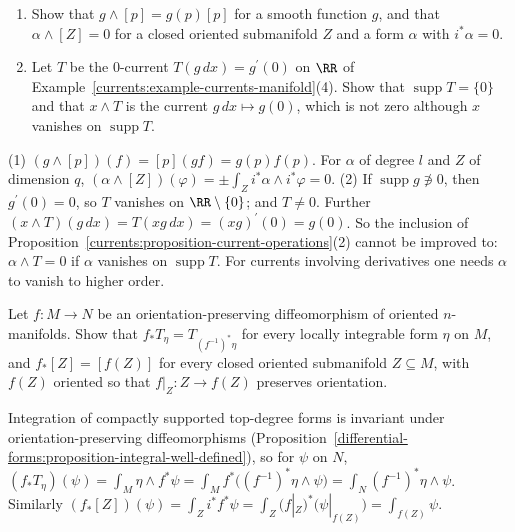 \begin{exercise}\label{currents:exercise-current-products-functions}
\begin{enumerate}
\item Show that $g \wedge [p] = g(p)[p]$ for a smooth function $g$, and that $\alpha \wedge [Z] = 0$ for a closed oriented submanifold $Z$ and a form $\alpha$ with $i^*\alpha = 0$.
\item Let $T$ be the $0$-current $T(g\,dx) = g^{\prime}(0)$ on $\RR$ of Example~\ref{currents:example-currents-manifold}(4). Show that $\operatorname{supp}T = \{0\}$ and that $x \wedge T$ is the current
$g\,dx \mapsto g(0)$, which is not zero although $x$ vanishes on $\operatorname{supp}T$.
\end{enumerate}
\end{exercise}

\begin{solution}
(1) $(g \wedge [p])(f) = [p](gf) = g(p)f(p)$. For $\alpha$ of degree $l$ and $Z$ of dimension $q$, $(\alpha \wedge [Z])(\varphi) = \pm\int_Zi^*\alpha \wedge i^*\varphi = 0$.
(2) If $\operatorname{supp}g \not\ni 0$, then $g^{\prime}(0) = 0$, so $T$ vanishes on $\RR \setminus \{0\}$; and $T \neq 0$. Further $(x \wedge T)(g\,dx) = T(xg\,dx) = (xg)^{\prime}(0) = g(0)$. So the inclusion
of Proposition~\ref{currents:proposition-current-operations}(2) cannot be improved to: $\alpha \wedge T = 0$ if $\alpha$ vanishes on $\operatorname{supp}T$. For currents involving derivatives one needs
$\alpha$ to vanish to higher order.
\end{solution}

\begin{exercise}\label{currents:exercise-pushforward-diffeomorphism}
Let $f \colon M \to N$ be an orientation-preserving diffeomorphism of oriented $n$-manifolds. Show that $f_*T_\eta = T_{(f^{-1})^*\eta}$ for every locally integrable form $\eta$ on $M$, and
$f_*[Z] = [f(Z)]$ for every closed oriented submanifold $Z \subseteq M$, with $f(Z)$ oriented so that $f|_Z \colon Z \to f(Z)$ preserves orientation.
\end{exercise}

\begin{solution}
Integration of compactly supported top-degree forms is invariant under orientation-preserving diffeomorphisms (Proposition~\ref{differential-forms:proposition-integral-well-defined}), so for $\psi$ on $N$,
$(f_*T_\eta)(\psi) = \int_M\eta \wedge f^*\psi = \int_Mf^*\bigl((f^{-1})^*\eta \wedge \psi\bigr) = \int_N(f^{-1})^*\eta \wedge \psi$. Similarly
$(f_*[Z])(\psi) = \int_Zi^*f^*\psi = \int_Z(f|_Z)^*\bigl(\psi|_{f(Z)}\bigr) = \int_{f(Z)}\psi$.
\end{solution}

